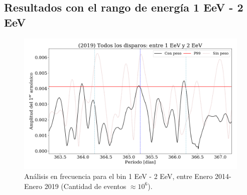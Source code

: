  



\subsection{Resultados con el rango de energía 1 EeV - 2 EeV}



\begin{figure}[htbp]
  \centering
  \includegraphics[width=\textwidth]{./../../Python/xx2019_AllTriggers_1_2_EeV_con_vs_sin_peso.png}
  \caption{Análisis en frecuencia para el bin 1 EeV - 2 EeV, entre Enero 2014- Enero 2019 (Cantidad de eventos $ \approx 10^6$).}
\end{figure}

 



